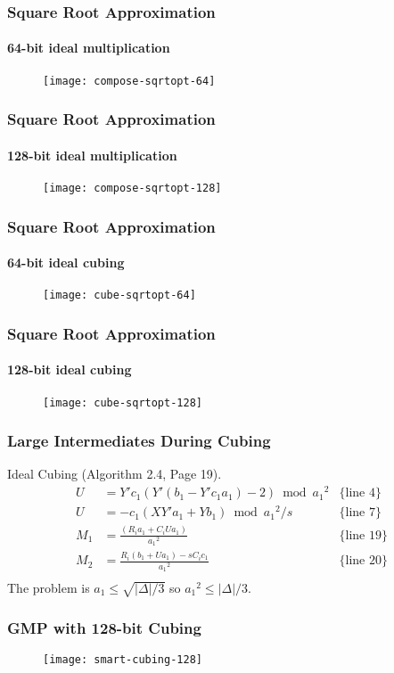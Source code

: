\documentclass{beamer}
\begin{document}
\begin{frame}
\frametitle{Square Root Approximation}
\framesubtitle{64-bit ideal multiplication}
\begin{figure}
\texttt{[image: compose-sqrtopt-64]}
\end{figure}
\end{frame}

\begin{frame}
\frametitle{Square Root Approximation}
\framesubtitle{128-bit ideal multiplication}
\begin{figure}
\texttt{[image: compose-sqrtopt-128]}
\end{figure}
\end{frame}

\begin{frame}
\frametitle{Square Root Approximation}
\framesubtitle{64-bit ideal cubing}
\begin{figure}
\texttt{[image: cube-sqrtopt-64]}
\end{figure}
\end{frame}

\begin{frame}
\frametitle{Square Root Approximation}
\framesubtitle{128-bit ideal cubing}
\begin{figure}
\texttt{[image: cube-sqrtopt-128]}
\end{figure}
\end{frame}


\begin{frame}
\frametitle{Large Intermediates During Cubing}
Ideal Cubing (Algorithm 2.4, Page 19).
\begin{align*}
U &= Y'c_1(Y'(b_1 - Y'c_1a_1) - 2) \bmod {a_1}^2 & \textrm{\{line 4\}}\\
U &= -c_1(XY'a_1+Yb_1) \bmod {a_1}^2/s & \textrm{\{line 7\}} \\
M_1 &= \frac{(R_ia_1 + C_iUa_1)}{{a_1}^2} & \textrm{\{line 19\}} \\
M_2 &= \frac{R_i(b_1 + Ua_1) - sC_ic_1}{{a_1}^2} & \textrm{\{line 20\}} \\
\end{align*}
The problem is $a_1 \le \sqrt{|\Delta|/3}$ so ${a_1}^2 \le |\Delta|/3$.
\end{frame}

\begin{frame}
\frametitle{GMP with 128-bit Cubing}
\begin{figure}
\texttt{[image: smart-cubing-128]}
\end{figure}
\end{frame}
\end{document}
